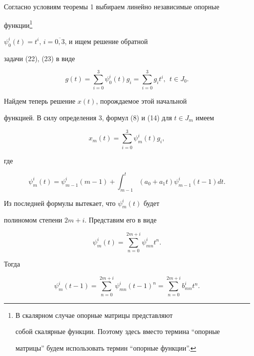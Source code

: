 Согласно условиям теоремы 1 выбираем линейно независимые опорные


функции\footnote{В скалярном случае опорные матрицы представляют


собой скалярные функции. Поэтому здесь вместо термина ``опорные


матрицы'' будем использовать термин ``опорные функции''.}


$\psi_0^i(t)=t^i$, $i=\overline{0,3}$, и ищем решение обратной


задачи (22), (23) в виде


\begin{equation}


g(t)=\sum_{i=0}^{3}\psi_0^i(t)g_i=


\sum_{i=0}^{3}g_it^i,\ \ t\in J_0.


\end{equation}


Найдем теперь решение $x(t)$, порождаемое этой начальной


функцией. В силу определения 3, формул (8) и (14) для $t\in J_m$ имеем


\begin{equation}


x_m(t)=\sum_{i=0}^{3}\psi_m^i(t)g_i,


\end{equation}


где


\begin{equation}


\psi_m^i(t)=\psi_{m-1}^i(m-1)+\int_{m-1}^t (a_0+a_1t)


\psi_{m-1}^i(t-1)dt.


\end{equation}


Из последней формулы вытекает, что $\psi_m^i(t)$ будет


полиномом степени $2m+i$. Представим его в виде


\begin{equation}


\psi_m^i(t)=\sum_{n=0}^{2m+i}\psi_{mn}^it^n.


\end{equation}


Тогда


\begin{equation}


\psi_m^i(t-1)=\sum_{n=0}^{2m+i}\psi_{mn}^i(t-1)^n=


\sum_{n=0}^{2m+i}b_{mn}^it^n.


\end{equation}


